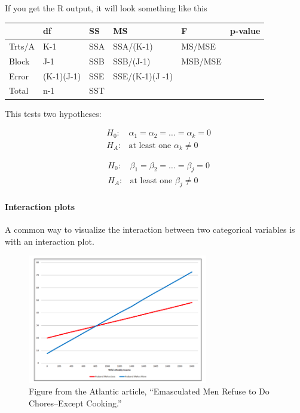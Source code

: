 \documentclass[10pt]{article}\usepackage[]{graphicx}\usepackage[]{color}
\begin{document}
If you get the R output, it will look something like this

\begin{table}[htbp]
\begin{tabular}{l|l|l|l|l|l}
& df & SS & MS & F & p-value \\ \hline
Trts/A & K-1 & SSA & SSA/(K-1) & MS/MSE & \\ \hline
Block & J-1 & SSB & SSB/(J-1) & MSB/MSE & \\ \hline
Error & (K-1)(J-1) & SSE & SSE/(K-1)(J -1) & & \\ \hline
Total & n-1 & SST & & & 
\end{tabular}
\end{table}

This tests two hypotheses:

\begin{eqnarray*}
&H_0:& \alpha_1=\alpha_2=\dots=\alpha_k=0 \\
&H_A:& \text{at least one } \alpha_k\neq0 
\end{eqnarray*}

\begin{eqnarray*}
&H_0:& \beta_1=\beta_2=\dots=\beta_j=0 \\
&H_A:& \text{at least one } \beta_j\neq0 
\end{eqnarray*}


\paragraph{Interaction plots}

A common way to visualize the interaction between two categorical variables is with an interaction plot. 

\begin{figure}[htbp]
\begin{center}
\includegraphics[width=0.7\textwidth]{Atlantic_Chores.png}
\caption{Figure from the Atlantic article, ``Emasculated Men Refuse to Do Chores--Except Cooking.'' \label{atlantic}}
\end{center}
\end{figure}
\end{document}
